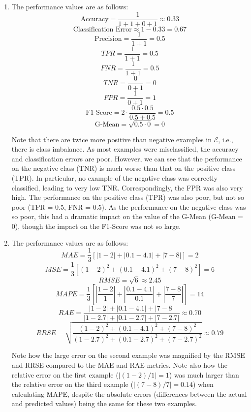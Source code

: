 \begin{enumerate}
\item The performance values are as follows:
     \[\text{Accuracy} = \frac{1}{1+1+0+1} \approx 0.33\]
     \[\text{Classification Error} \approx 1 - 0.33 = 0.67\]
     \[\text{Precision} = \frac{1}{1+1} = 0.5\]
     \[TPR = \frac{1}{1+1} = 0.5\]
     \[FNR = \frac{1}{1+1} = 0.5\]
     \[TNR = \frac{0}{0+1} = 0\]
     \[FPR = \frac{1}{0+1} = 1\]
     \[\text{F1-Score} = 2 \cdot \frac{0.5 \cdot 0.5}{0.5 + 0.5} = 0.5\]
     \[\text{G-Mean} = \sqrt{0.5 \cdot 0} = 0\]

     Note that there are twice more positive than negative examples in $\mathcal{E}$, i.e., there is class imbalance. As most examples were misclassified, the accuracy and classification errors are poor. However, we can see that the performance on the negative class (TNR) is much worse than that on the positive class (TPR). In particular, no example of the negative class was correctly classified, leading to very low TNR. Correspondingly, the FPR was also very high. The performance on the positive class (TPR) was also poor, but not so poor (TPR = 0.5, FNR = 0.5). As the performance on the negative class was so poor, this had a dramatic impact on the value of the G-Mean (G-Mean = 0), though the impact on the F1-Score was not so large.

\item The performance values are as follows:
    \[MAE = \frac{1}{3} [|1-2| + |0.1 - 4.1| + |7-8|] = 2\]
    \[MSE = \frac{1}{3} [(1-2)^2 + (0.1-4.1)^2 + (7-8)^2] = 6\]
    \[RMSE = \sqrt{6} \approx 2.45\]
    \[MAPE = \frac{1}{3} \left[ \left| \frac{1-2}{1} \right| + \left| \frac{0.1-4.1}{0.1} \right| + \left| \frac{7-8}{7} \right|\right] = 14\]
    \[RAE = \frac{|1-2| + |0.1-4.1| + |7-8|}{|1-2.7| + |0.1 - 2.7| + |7 - 2.7|} \approx 0.70 \]
    \[RRSE = \sqrt{\frac{(1-2)^2 + (0.1-4.1)^2 + (7-8)^2}{(1-2.7)^2 + (0.1 - 2.7)^2 + (7 - 2.7)^2}} \approx 0.79\]

    Note how the large error on the second example was magnified by the RMSE and RRSE compared to the MAE and RAE metrics. Note also how the relative error on the first example ($|(1-2)/1| = 1$) was much larger than the relative error on the third example ($|(7-8)/7| = 0.14$) when calculating MAPE, despite the absolute errors (differences between the actual and predicted values) being the same for these two examples. 
\end{enumerate}




